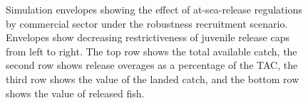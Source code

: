 \documentclass[11pt]{book}
\begin{document}
\begin{landscape}
\begin{figure}[htb]
{\centering {} 

}

\caption{Simulation envelopes showing the effect of at-sea-release regulations by commercial sector under the robustness recruitment scenario. Envelopes show decreasing restrictiveness of juvenile release caps from left to right. The top row shows the total available catch, the second row shows release overages as a percentage of the TAC, the third row shows the value of the landed catch, and the bottom row shows the value of released fish.}\label{fig:unnamed-chunk-24}
\end{figure}
\end{landscape}
\MakeAvailable
\end{document}
